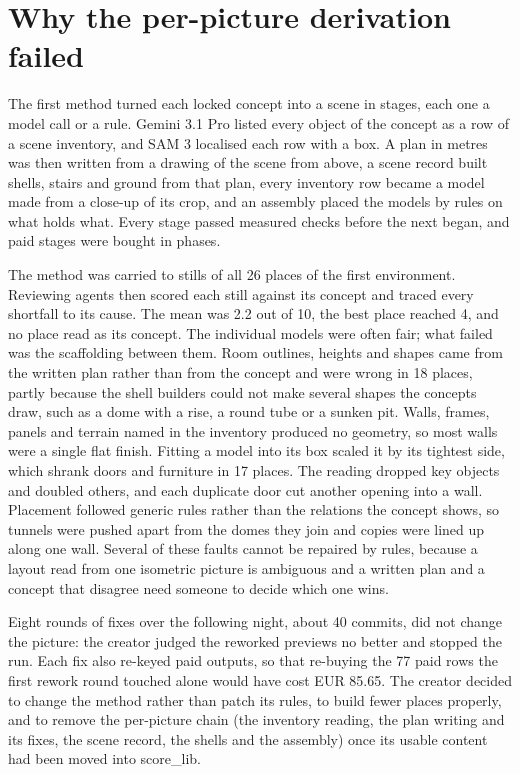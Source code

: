 \section{Why the per-picture derivation failed}\label{why-the-per-picture-derivation-failed}

The first method turned each locked concept into a scene in stages, each one a model call or a rule. Gemini 3.1 Pro \citep{gemini31pro} listed every object of the concept as a row of a scene inventory, and SAM 3 \citep{carion2025sam3} localised each row with a box. A plan in metres was then written from a drawing of the scene from above, a scene record built shells, stairs and ground from that plan, every inventory row became a model made from a close-up of its crop, and an assembly placed the models by rules on what holds what. Every stage passed measured checks before the next began, and paid stages were bought in phases.

The method was carried to stills of all 26 places of the first environment. Reviewing agents then scored each still against its concept and traced every shortfall to its cause. The mean was 2.2 out of 10, the best place reached 4, and no place read as its concept. The individual models were often fair; what failed was the scaffolding between them. Room outlines, heights and shapes came from the written plan rather than from the concept and were wrong in 18 places, partly because the shell builders could not make several shapes the concepts draw, such as a dome with a rise, a round tube or a sunken pit. Walls, frames, panels and terrain named in the inventory produced no geometry, so most walls were a single flat finish. Fitting a model into its box scaled it by its tightest side, which shrank doors and furniture in 17 places. The reading dropped key objects and doubled others, and each duplicate door cut another opening into a wall. Placement followed generic rules rather than the relations the concept shows, so tunnels were pushed apart from the domes they join and copies were lined up along one wall. Several of these faults cannot be repaired by rules, because a layout read from one isometric picture is ambiguous and a written plan and a concept that disagree need someone to decide which one wins.

Eight rounds of fixes over the following night, about 40 commits, did not change the picture: the creator judged the reworked previews no better and stopped the run. Each fix also re-keyed paid outputs, so that re-buying the 77 paid rows the first rework round touched alone would have cost EUR 85.65. The creator decided to change the method rather than patch its rules, to build fewer places properly, and to remove the per-picture chain (the inventory reading, the plan writing and its fixes, the scene record, the shells and the assembly) once its usable content had been moved into score\_lib.
